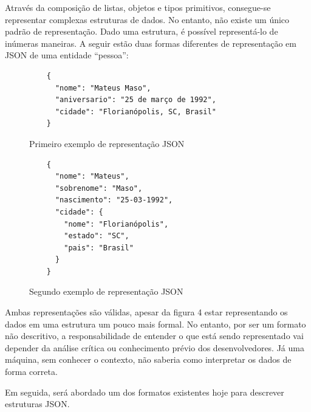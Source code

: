 \begin{table}[H]
  \centering
  \caption{Tipos de valores em JSON}
\end{table}

Através da composição de listas, objetos e tipos primitivos, consegue-se representar complexas estruturas de dados. No entanto, não existe um único padrão de representação. Dado uma estrutura, é possível representá-lo de inúmeras maneiras. A seguir estão duas formas diferentes de representação em JSON de uma entidade “pessoa”:
 \cite{Droettboom2015}

\begin{figure}[H]
  \centering
  \begin{verbatim}
    {
      "nome": "Mateus Maso",
      "aniversario": "25 de março de 1992",
      "cidade": "Florianópolis, SC, Brasil"
    }
  \end{verbatim}
  \caption{Primeiro exemplo de representação JSON}
\end{figure}

\begin{figure}[H]
  \centering
  \begin{verbatim}
    {
      "nome": "Mateus",
      "sobrenome": "Maso",
      "nascimento": "25-03-1992",
      "cidade": {
        "nome": "Florianópolis",
        "estado": "SC",
        "pais": "Brasil"
      }
    }
  \end{verbatim}
  \caption{Segundo exemplo de representação JSON}
\end{figure}

Ambas representações são válidas, apesar da figura 4 estar representando os dados em uma estrutura um pouco mais formal. No entanto, por ser um formato não descritivo, a responsabilidade de entender o que está sendo representado vai depender da análise crítica ou conhecimento prévio dos desenvolvedores. Já uma máquina, sem conhecer o contexto, não saberia como interpretar os dados de forma correta. \cite{Droettboom2015}

Em seguida, será abordado um dos formatos existentes hoje para descrever estruturas JSON.


